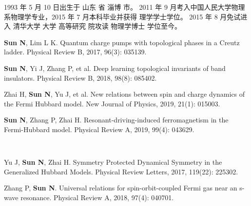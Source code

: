 \begin{resume}


    1993 年 5 月 10 日出生于 山东 省 淄博 市。
    2011 年 9 月考入中国人民大学物理系物理学专业，2015 年 7 月本科毕业并获得
    理学学士学位。
    2015 年 8 月免试进入 清华大学 大学 高等研究 院攻读 物理学博士 学位至今。


    \begin{publications}
        \item \textbf{Sun N}, Lim L K. Quantum charge pumps with topological phases in 
            a Creutz ladder. Physical Review B, 2017, 96(3): 035139.

        \item \textbf{Sun N}, Yi J, Zhang P, et al. Deep learning topological 
        invariants of band insulators. Physical Review B, 2018, 98(8): 085402.


        \item Zhai H, \textbf{Sun N}, Yu J, et al. New relations between spin and 
        charge dynamics of the Fermi Hubbard model. 
        New Journal of Physics, 2019, 21(1): 015003.

        \item \textbf{Sun N}, Zhang P, Zhai H. Resonant-driving-induced ferromagnetism in the Fermi-Hubbard model. Physical Review A, 2019, 99(4): 043629.
    \end{publications}
    ~


    \begin{publications}
        \item Yu J, \textbf{Sun N}, Zhai H. Symmetry Protected Dynamical Symmetry in 
        the Generalized Hubbard Models. Physical Review Letters, 2017, 119(22): 225302.
        \item Zhang P, \textbf{Sun N}. Universal relations for spin-orbit-coupled 
        Fermi gas near an s-wave resonance. Physical Review A, 2018, 97(4): 040701.
    \end{publications}

\end{resume}
